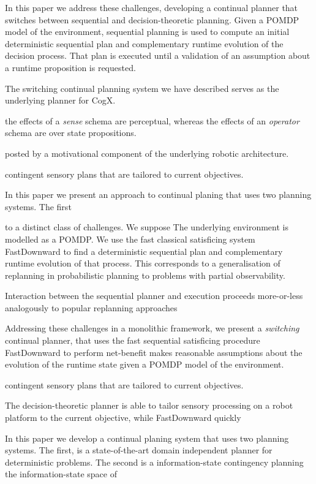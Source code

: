 \documentclass[letterpaper]{article}
\begin{document}
In this paper we address these challenges, developing a continual
planner that switches between sequential and decision-theoretic
planning. Given a POMDP model of the environment, sequential planning
is used to compute an initial deterministic sequential plan and
complementary runtime evolution of the decision process. That plan is
executed until a validation of an assumption about a runtime
proposition is requested.







The switching continual planning system we have described serves as
the underlying planner for CogX.




the effects of a {\em sense} schema are perceptual, whereas the
effects of an {\em operator} schema are over state propositions.




posted by a motivational component of the underlying robotic
architecture. 

contingent sensory plans that are tailored to current
objectives.

In this paper we present an approach to continual planing that uses
two planning systems. The first 

 to a distinct class of
challenges. We suppose 
The underlying environment is modelled as a POMDP. We use the fast
classical satisficing system FastDownward to find a deterministic
sequential plan and complementary runtime evolution of that
process. This corresponds to a generalisation of replanning in
probabilistic planning to problems with partial observability.

Interaction between the sequential planner and execution proceeds
more-or-less analogously to popular replanning approaches

Addressing these challenges in a monolithic framework, we present a
{\em switching} continual planner, that uses the fast sequential
satisficing procedure FastDownward to perform net-benefit
makes reasonable assumptions about the evolution of the runtime state
given a POMDP model of the environment. 

contingent sensory plans that are tailored to current
objectives.


The decision-theoretic planner is able to tailor sensory processing on
a robot platform to the current objective, while FastDownward  quickly 


In this paper we develop a continual planing system that uses two
planning systems. The first, is a state-of-the-art domain independent
planner for deterministic problems. The second is a information-state
contingency planning the information-state space of 
\end{document}
